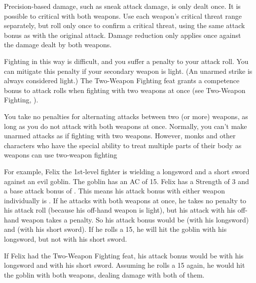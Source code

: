 \par Precision-based damage, such as sneak attack damage, is only dealt once. It is possible to critical with both weapons. Use each weapon's critical threat range separately, but roll only once to confirm a critical threat, using the same attack bonus as with the original attack. Damage reduction only applies once against the damage dealt by both weapons.

\par Fighting in this way is difficult, and you suffer a  penalty to your attack roll. You can mitigate this penalty if your secondary weapon is light. (An unarmed strike is always considered light.) The Two-Weapon Fighting feat grants a  competence bonus to attack rolls when fighting with two weapons at once (see Two-Weapon Fighting, ).

You take no penalties for alternating attacks between two (or more) weapons, as long as you do not attack with both weapons at once. Normally, you can't make unarmed attacks as if fighting with two weapons. However, monks and other characters who have the special ability to treat multiple parts of their body as weapons can use two-weapon fighting

\par For example, Felix the 1st-level fighter is wielding a longsword and a short sword against an evil goblin. The goblin has an AC of 15. Felix has a Strength of 3 and a base attack bonus of . This means his attack bonus with either weapon individually is . If he attacks with both weapons at once, he takes no penalty to his attack roll (because his off-hand weapon is light), but his attack with his off-hand weapon takes a  penalty. So his attack bonus would be  (with his longsword) and  (with his short sword). If he rolls a 15, he will hit the goblin with his longsword, but not with his short sword.

\par If Felix had the Two-Weapon Fighting feat, his attack bonus would be  with his longsword and  with his short sword. Assuming he rolls a 15 again, he would hit the goblin with both weapons, dealing damage with both of them.

